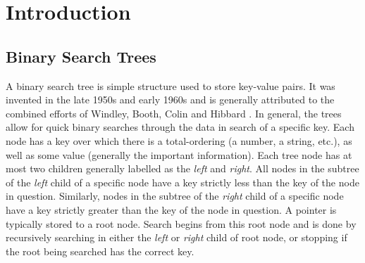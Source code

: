 \documentclass[letterpaper,12pt,titlepage,oneside,final]{book}
\theoremstyle{plain}
\begin{document}
 


\chapter{Introduction}


\section{Binary Search Trees}

A binary search tree is simple structure used to store key-value pairs. It was invented in the late 1950s and early 1960s and is generally attributed to the combined efforts of Windley, Booth, Colin and Hibbard \cite{windley1960trees} \cite{booth1960efficiency} \cite{hibbard1962some}. In general, the trees allow for quick binary searches through the data in search of a specific key. Each node has a key over which there is a total-ordering (a number, a string, etc.), as well as some value (generally the important information). Each tree node has at most two children generally labelled as the \textit{left} and \textit{right}. All nodes in the subtree of the \textit{left} child of a specific node have a key strictly less than the key of the node in question. Similarly, nodes in the subtree of the \textit{right} child of a specific node have a key strictly greater than the key of the node in question. A pointer is typically stored to a root node. Search begins from this root node and is done by recursively searching in either the \textit{left} or \textit{right} child of root node, or stopping if the root being searched has the correct key.
\end{document}
